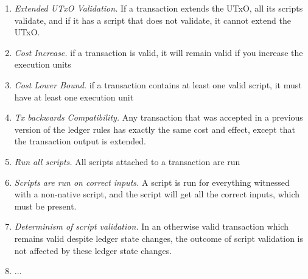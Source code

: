 \begin{enumerate}
\item
  \emph{Extended UTxO Validation.}
  If a transaction extends the UTxO, all its scripts validate, and
  if it has a script that does not validate, it cannot extend the
  UTxO.
\item
  \emph{Cost Increase.} if a transaction is valid, it will remain valid if you increase the execution units
\item
  \emph{Cost Lower Bound.} if a transaction contains at least one valid script, it must have at least one execution unit
\item
  \emph{Tx backwards Compatibility.} Any transaction that was accepted in a previous version of the ledger rules
    has exactly the same cost and effect, except that the transaction output is extended.
\item \emph{Run all scripts.} All scripts attached to a transaction are run
\item \emph{Scripts are run on correct inputs.}
  A script is run for everything witnessed with a non-native script, and the script will
get all the correct inputs, which must be present.
\item \emph{Determinism of script validation.} In an otherwise valid transaction which remains valid
  despite ledger state changes, the outcome
  of script validation is not affected by these ledger state changes.
\item
  ... 
\end{enumerate}
